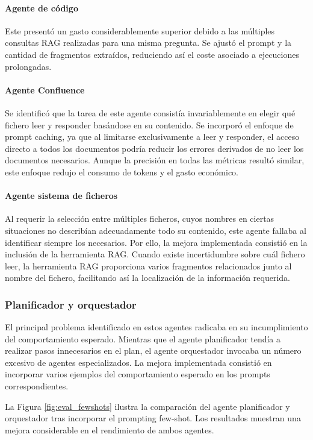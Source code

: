 \paragraph{Agente de código}Este presentó un gasto considerablemente superior debido a las múltiples consultas RAG realizadas para una misma pregunta. Se ajustó el prompt y la cantidad de fragmentos extraídos, reduciendo así el coste asociado a ejecuciones prolongadas.

\paragraph{Agente Confluence} Se identificó que la tarea de este agente consistía invariablemente en elegir qué fichero leer y responder basándose en su contenido. Se incorporó el enfoque de prompt caching, ya que al limitarse exclusivamente a leer y responder, el acceso directo a todos los documentos podría reducir los errores derivados de no leer los documentos necesarios. Aunque la precisión en todas las métricas resultó similar, este enfoque redujo el consumo de tokens y el gasto económico.

\paragraph{Agente sistema de ficheros} Al requerir la selección entre múltiples ficheros, cuyos nombres en ciertas situaciones no describían adecuadamente todo su contenido, este agente fallaba al identificar siempre los necesarios. Por ello, la mejora implementada consistió en la inclusión de la herramienta RAG. Cuando existe incertidumbre sobre cuál fichero leer, la herramienta RAG proporciona varios fragmentos relacionados junto al nombre del fichero, facilitando así la localización de la información requerida.

\subsubsection{Planificador y orquestador}
El principal problema identificado en estos agentes radicaba en su incumplimiento del comportamiento esperado. Mientras que el agente planificador tendía a realizar pasos innecesarios en el plan, el agente orquestador invocaba un número excesivo de agentes especializados. La mejora implementada consistió en incorporar varios ejemplos del comportamiento esperado en los prompts correspondientes.

La Figura \ref{fig:eval_fewshots} ilustra la comparación del agente planificador y orquestador tras incorporar el prompting few-shot. Los resultados muestran una mejora considerable en el rendimiento de ambos agentes.


